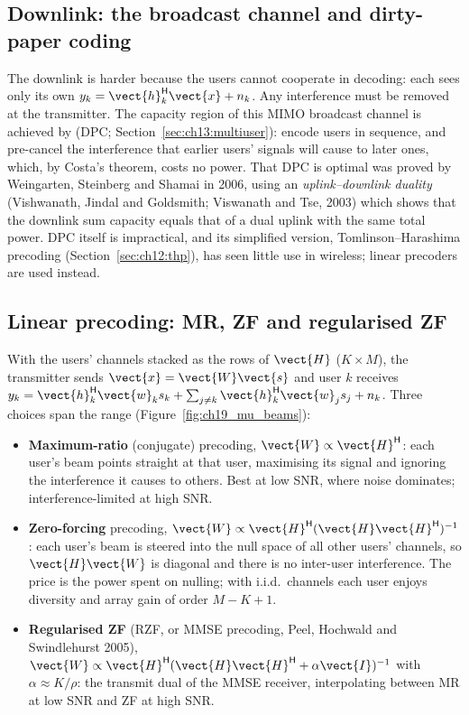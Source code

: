 \subsection{Downlink: the broadcast channel and dirty-paper coding}

The downlink is harder because the users cannot cooperate in decoding: each sees only its own
$y_k=\vect{h}_k^{\mathsf H}\vect{x}+n_k$. Any interference must be removed at the transmitter. The
capacity region of this MIMO broadcast channel is achieved by  (DPC;
Section~\ref{sec:ch13:multiuser}): encode users in sequence, and pre-cancel the interference that
earlier users' signals will cause to later ones, which, by Costa's theorem, costs no power. That DPC
is optimal was proved by Weingarten, Steinberg and Shamai in 2006, using an
\emph{uplink--downlink duality} (Vishwanath, Jindal and Goldsmith; Viswanath and Tse, 2003) which
shows that the downlink sum capacity equals that of a dual uplink with the same total power. DPC
itself is impractical, and its simplified version, Tomlinson--Harashima precoding
(Section~\ref{sec:ch12:thp}), has seen little use in wireless; linear precoders are used instead.

\subsection{Linear precoding: MR, ZF and regularised ZF}

With the users' channels stacked as the rows of $\vect{H}$ ($K\times M$), the transmitter sends
$\vect{x}=\vect{W}\vect{s}$ and user $k$ receives
$y_k=\vect{h}_k^{\mathsf H}\vect{w}_ks_k+\sum_{j\ne k}\vect{h}_k^{\mathsf H}\vect{w}_js_j+n_k$. Three
choices span the range (Figure~\ref{fig:ch19_mu_beams}):
\begin{itemize}
\item \textbf{Maximum-ratio} (conjugate) precoding, $\vect{W}\propto\vect{H}^{\mathsf H}$: each user's
beam points straight at that user, maximising its signal and ignoring the interference it causes
to others. Best at low SNR, where noise dominates; interference-limited at high SNR.
\item \textbf{Zero-forcing} precoding, $\vect{W}\propto\vect{H}^{\mathsf H}(\vect{H}\vect{H}^{\mathsf H})^{-1}$:
each user's beam is steered into the null space of all other users' channels, so
$\vect{H}\vect{W}$ is diagonal and there is no inter-user interference. The price is the power
spent on nulling; with i.i.d.\ channels each user enjoys diversity and array gain of order $M-K+1$.
\item \textbf{Regularised ZF} (RZF, or MMSE precoding, Peel, Hochwald and Swindlehurst 2005),
$\vect{W}\propto\vect{H}^{\mathsf H}(\vect{H}\vect{H}^{\mathsf H}+\alpha\vect{I})^{-1}$ with
$\alpha\approx K/\rho$: the transmit dual of the MMSE receiver, interpolating between MR at low SNR
and ZF at high SNR.
\end{itemize}

